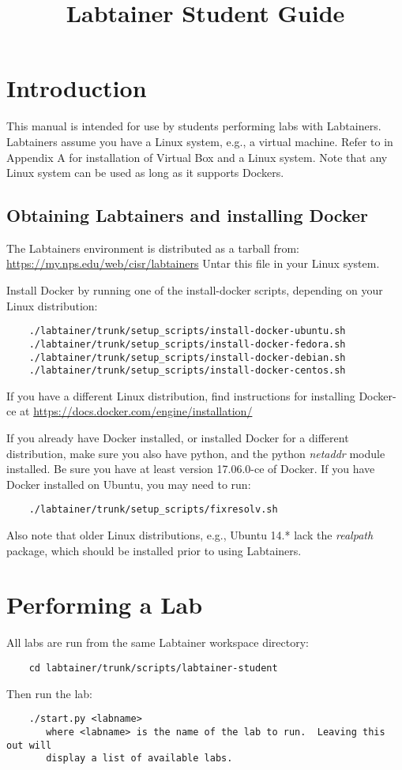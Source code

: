 \documentclass[12pt]{article}
\begin{document}
\title {Labtainer Student Guide}
\maketitle

\section {Introduction}
This manual is intended for use by students performing labs with Labtainers.
Labtainers assume you have a Linux system, e.g., a virtual machine.  Refer to
in Appendix A for installation of Virtual Box and a Linux system.
Note that any Linux system can be used as long as it supports Dockers.

\subsection{Obtaining Labtainers and installing Docker}
The Labtainers environment is distributed as a tarball from:
\url{https://my.nps.edu/web/cisr/labtainers}
Untar this file in your Linux system.

Install Docker by running one of the install-docker scripts, depending on your Linux
distribution:
\begin{verbatim}
    ./labtainer/trunk/setup_scripts/install-docker-ubuntu.sh
    ./labtainer/trunk/setup_scripts/install-docker-fedora.sh
    ./labtainer/trunk/setup_scripts/install-docker-debian.sh
    ./labtainer/trunk/setup_scripts/install-docker-centos.sh
\end{verbatim}
If you have a different Linux distribution, find instructions for installing Docker-ce at
\url{https://docs.docker.com/engine/installation/}

If you already have Docker installed, or installed Docker for a different distribution,
make sure you also have python, and
the python \textit{netaddr} module installed.  Be sure you have at least version 17.06.0-ce of Docker.
If you have Docker installed on Ubuntu, you
may need to run:
\begin{verbatim}
    ./labtainer/trunk/setup_scripts/fixresolv.sh
\end{verbatim}
\noindent Also note that older Linux distributions, e.g., Ubuntu 14.* lack the
\textit{realpath} package, which should be installed prior to using Labtainers.

\section{Performing a Lab}
All labs are run from the same Labtainer workspace directory:
\begin{verbatim}
    cd labtainer/trunk/scripts/labtainer-student
\end{verbatim}
\noindent Then run the lab:
\begin{verbatim}
    ./start.py <labname>
       where <labname> is the name of the lab to run.  Leaving this out will 
       display a list of available labs.
\end{verbatim}
\end{document}
